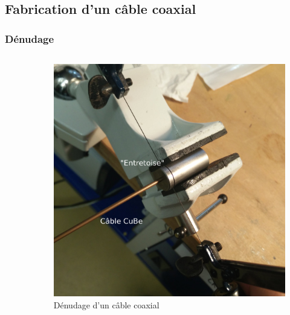 \documentclass[8pt,a9paper]{beamer} \usepackage[utf8]{inputenc} \usepackage[francais]{babel} \usepackage[T1]{fontenc}
\begin{document}
\subsection{Fabrication d'un câble coaxial}
\begin{frame}
\frametitle{Dénudage}
\begin{columns}
\begin{column}{0.7\textwidth}
    \begin{description}
        \item[]~\\
    \end{description}
\end{column}
\begin{column}{0.3\textwidth}
\begin{figure}[h]
    \begin{center}
        \includegraphics[width=\textwidth]{Images/Coax/1}
        \caption{Dénudage d'un câble coaxial}
    \end{center}
\end{figure}
\end{column}
\end{columns}
\end{frame}
\end{document}
